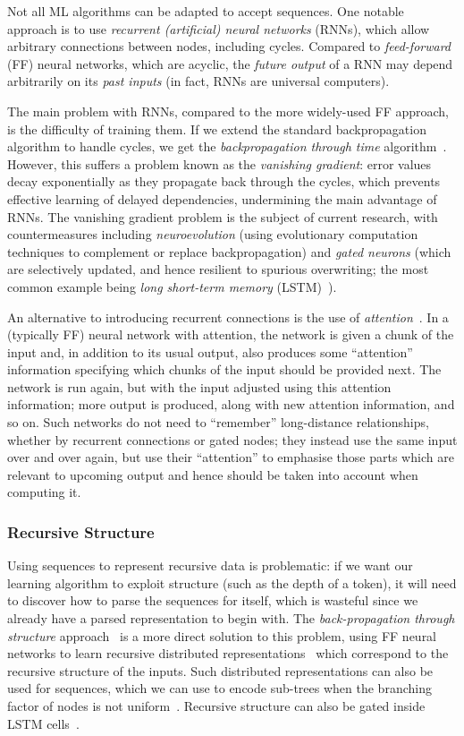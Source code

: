 Not all ML algorithms can be adapted to accept sequences. One notable approach
is to use \emph{recurrent (artificial) neural networks} (RNNs), which allow
arbitrary connections between nodes, including cycles. Compared to
\emph{feed-forward} (FF) neural networks, which are acyclic, the \emph{future
  output} of a RNN may depend arbitrarily on its \emph{past inputs} (in fact,
RNNs are universal computers).

The main problem with RNNs, compared to the more widely-used FF approach, is the
difficulty of training them. If we extend the standard backpropagation algorithm
to handle cycles, we get the \emph{backpropagation through time}
algorithm~\cite{werbos1990backpropagation}. However, this suffers a problem
known as the \emph{vanishing gradient}: error values decay exponentially as they
propagate back through the cycles, which prevents effective learning of delayed
dependencies, undermining the main advantage of RNNs. The vanishing gradient
problem is the subject of current research, with countermeasures including
\emph{neuroevolution} (using evolutionary computation techniques to complement
or replace backpropagation) and \emph{gated neurons} (which are selectively
updated, and hence resilient to spurious overwriting; the most common example
being \emph{long short-term memory} (LSTM)~\cite{hochreiter1997long}).

An alternative to introducing recurrent connections is the use of
\emph{attention}~\cite{vaswani2017attention}. In a (typically FF) neural network
with attention, the network is given a chunk of the input and, in addition to
its usual output, also produces some ``attention'' information specifying which
chunks of the input should be provided next. The network is run again, but with
the input adjusted using this attention information; more output is produced,
along with new attention information, and so on. Such networks do not need to
``remember'' long-distance relationships, whether by recurrent connections or
gated nodes; they instead use the same input over and over again, but use their
``attention'' to emphasise those parts which are relevant to upcoming
output and hence should be taken into account when computing it.

\subsubsection{Recursive Structure}

Using sequences to represent recursive data is problematic: if we want our
learning algorithm to exploit structure (such as the depth of a token), it will
need to discover how to parse the sequences for itself, which is wasteful since
we already have a parsed representation to begin with. The
\emph{back-propagation through structure} approach~\cite{goller1996learning} is
a more direct solution to this problem, using FF neural networks to learn
recursive distributed representations~\cite{pollack1990recursive} which
correspond to the recursive structure of the inputs. Such distributed
representations can also be used for sequences, which we can use to encode
sub-trees when the branching factor of nodes is not
uniform~\cite{kwasny1995tail}. Recursive structure can also be gated inside
LSTM cells~\cite{zhu2015long}.

